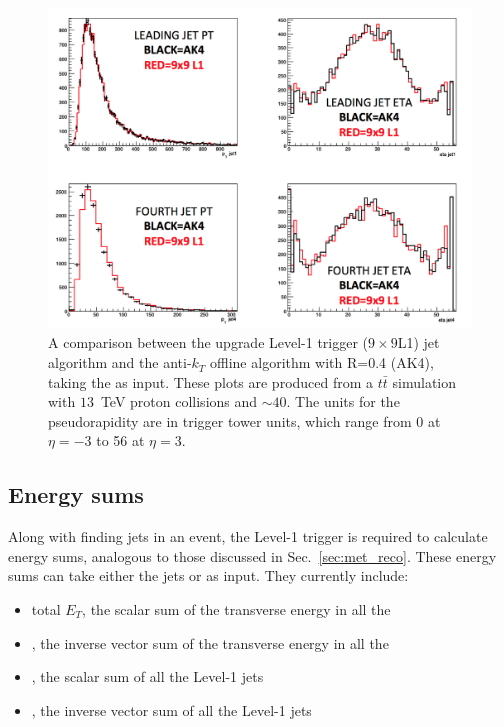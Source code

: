 \begin{figure}
	\begin{center}
		\includegraphics[width=1.0\linewidth]{figs/trigger/jet_l1s2_compak4}
	\end{center}
  \caption{A comparison between the upgrade Level-1 trigger ($9\times9$L1) jet
  algorithm and the anti-$k_T$ offline algorithm with R=0.4 
  (AK4), taking
  the \TTs as input.  These plots are produced from a
  $t\bar{t}$ simulation with $13$~TeV proton collisions and \PU $\sim40$.
  The units for the pseudorapidity are in trigger tower units, which
  range from 0 at $\eta =-3$ to 56 at $\eta=3$.}
	\label{fig:ak4_comp}
\end{figure}

\subsection{Energy sums}

Along with finding jets in an event, the Level-1 trigger is required
to calculate energy sums, analogous to those discussed in
Sec.~\ref{sec:met_reco}.  These energy sums can take either the jets
or \TTs as input. They currently include:
\begin{itemize}
\item{total $E_T$, the scalar sum of the transverse energy in all the
\TTs}
\item{\met, the inverse vector sum of the transverse energy in all the
\TTs}
\item{\HT, the scalar sum of all the Level-1 jets}
\item{\MHT, the inverse vector sum of all the Level-1 jets}
\end{itemize}

